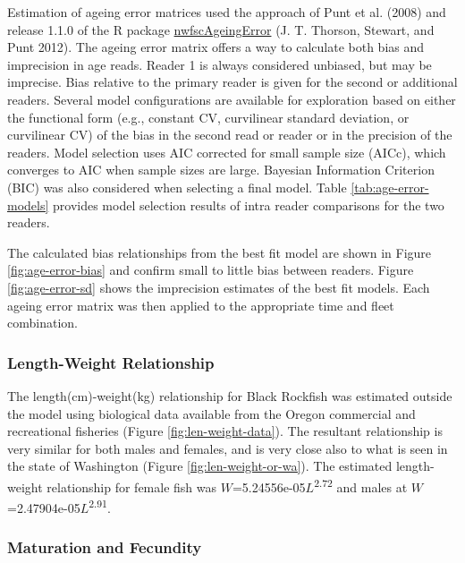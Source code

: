 \documentclass[11pt,
  english,
  letterpaper,
]{article}
\begin{document}
Estimation of ageing error matrices used the approach of Punt et al. (2008) and release 1.1.0 of the R package \href{https://github.com/nwfsc-assess/nwfscAgeingError}{nwfscAgeingError} (J. T. Thorson, Stewart, and Punt 2012). The ageing error matrix offers a way to calculate both bias and imprecision in age reads. Reader 1 is always considered unbiased, but may be imprecise. Bias relative to the primary reader is given for the second or additional readers. Several model configurations are available for exploration based on either the functional form (e.g., constant CV, curvilinear standard deviation, or curvilinear CV) of the bias in the second read or reader or in the precision of the readers. Model selection uses AIC corrected for small sample size (AICc), which converges to AIC when sample sizes are large. Bayesian Information Criterion (BIC) was also considered when selecting a final model. Table \ref{tab:age-error-models} provides model selection results of intra reader comparisons for the two readers.

The calculated bias relationships from the best fit model are shown in Figure \ref{fig:age-error-bias} and confirm small to little bias between readers. Figure \ref{fig:age-error-sd} shows the imprecision estimates of the best fit models. Each ageing error matrix was then applied to the appropriate time and fleet combination.

\hypertarget{length-weight-relationship}{%
\subsubsection{Length-Weight Relationship}\label{length-weight-relationship}}

The length(cm)-weight(kg) relationship for Black Rockfish was estimated outside the model using biological data available from the Oregon commercial and recreational fisheries (Figure \ref{fig:len-weight-data}). The resultant relationship is very similar for both males and females, and is very close also to what is seen in the state of Washington (Figure \ref{fig:len-weight-or-wa}). The estimated length-weight relationship for female fish was \(W\)=5.24556e-05\(L\)\textsuperscript{2.72} and males at \(W\)=2.47904e-05\(L\)\textsuperscript{2.91}.

\hypertarget{maturation-and-fecundity}{%
\subsubsection{Maturation and Fecundity}\label{maturation-and-fecundity}}
\end{document}
